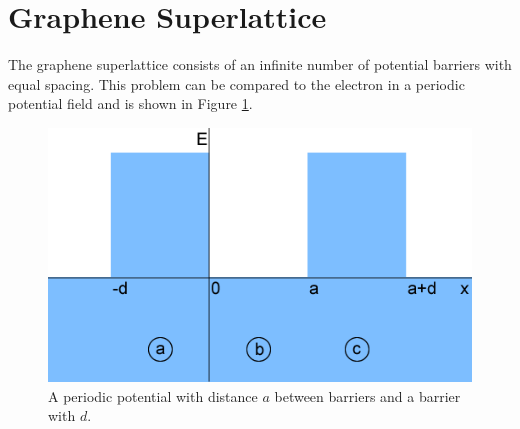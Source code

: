 \documentclass[12pt,a4paper]{report}
\begin{document}
			\section{Graphene Superlattice}
			\label{Rectangular Barrier - Graphene Superlattice}
			The graphene superlattice consists of an infinite number of potential barriers with equal spacing. This problem can be compared to the electron in a periodic potential field \cite{b32} and is shown in Figure \ref{periodic}.
			\begin{figure}[h]
				\centerline{\includegraphics[scale=0.5]{images/periodic}}
				\caption{A periodic potential with distance $a$ between barriers and a barrier with $d$.}
				\label{periodic}
			\end{figure}
\end{document}
